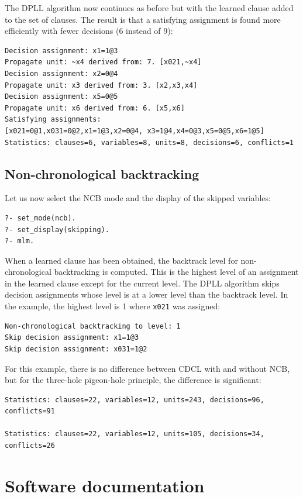 \documentclass[11pt]{report}
\newcommand*{\p}[1]{\textup{\texttt{#1}}}
\begin{document}
The DPLL algorithm now continues as before but with the learned clause
added to the set of clauses. The result is that a satisfying assignment
is found more efficiently with fewer decisions (6 instead of 9):

\begin{verbatim}
Decision assignment: x1=1@3
Propagate unit: ~x4 derived from: 7. [x021,~x4]
Decision assignment: x2=0@4
Propagate unit: x3 derived from: 3. [x2,x3,x4]
Decision assignment: x5=0@5
Propagate unit: x6 derived from: 6. [x5,x6]
Satisfying assignments:
[x021=0@1,x031=0@2,x1=1@3,x2=0@4, x3=1@4,x4=0@3,x5=0@5,x6=1@5]
Statistics: clauses=6, variables=8, units=8, decisions=6, conflicts=1
\end{verbatim}


\section{Non-chronological backtracking}

Let us now select the NCB mode and the display of the skipped variables:
\begin{verbatim}
?- set_mode(ncb).
?- set_display(skipping).
?- mlm.
\end{verbatim}

When a learned clause has been obtained, the backtrack level for
non-chronological backtracking is computed. This is the highest level of
an assignment in the learned clause except for the current level.
The DPLL algorithm skips decision assignments whose level is at a lower
level than the backtrack level. In the example, the highest level is 1
where \p{x021} was assigned:

\begin{verbatim}
Non-chronological backtracking to level: 1
Skip decision assignment: x1=1@3
Skip decision assignment: x031=1@2
\end{verbatim}

For this example, there is no difference between CDCL with and without
NCB, but for the three-hole pigeon-hole principle, the difference is
significant:
\begin{verbatim}
Statistics: clauses=22, variables=12, units=243, decisions=96, conflicts=91

Statistics: clauses=22, variables=12, units=105, decisions=34, conflicts=26
\end{verbatim}




\chapter{Software documentation}
\end{document}
